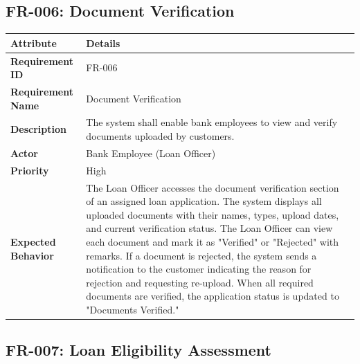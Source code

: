 \documentclass[12pt,a4paper,oneside]{report}
\begin{document}
\subsection{FR-006: Document Verification}

\begin{table}[htbp]
\centering
\small
\begin{tabularx}{\textwidth}{l l}
\toprule
\textbf{Attribute} & \textbf{Details} \\
\midrule
\textbf{Requirement ID} & FR-006 \\
\textbf{Requirement Name} & Document Verification \\
\textbf{Description} & The system shall enable bank employees to view and verify documents uploaded by customers. \\
\textbf{Actor} & Bank Employee (Loan Officer) \\
\textbf{Priority} & High \\
\textbf{Expected Behavior} & The Loan Officer accesses the document verification section of an assigned loan application. The system displays all uploaded documents with their names, types, upload dates, and current verification status. The Loan Officer can view each document and mark it as "Verified" or "Rejected" with remarks. If a document is rejected, the system sends a notification to the customer indicating the reason for rejection and requesting re-upload. When all required documents are verified, the application status is updated to "Documents Verified." \\
\bottomrule
\end{tabularx}
\end{table}

\subsection{FR-007: Loan Eligibility Assessment}
\end{document}
